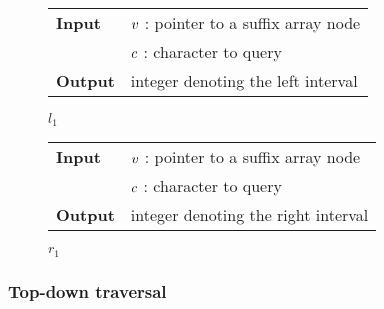 \begin{figure*}[t!]
\begin{minipage}[t]{.5\textwidth}
\begin{algorithm}[H]
\begin{tabular}{ll}
\textbf{Input}  & $v$ : pointer to a suffix array node\\
				& $c$ : character to query\\
\textbf{Output} & integer denoting the left interval\\
\end{tabular}
\begin{algorithmic}[1]
	\Else
	\EndIf
\EndWhile
\State \Return $l_1$
\end{algorithmic}
\label{alg:sa-lower}
\end{algorithm}
\end{minipage}
\hfill
\begin{minipage}[t]{.5\textwidth}
\begin{algorithm}[H]
\begin{tabular}{ll}
\textbf{Input}  & $v$ : pointer to a suffix array node\\
				& $c$ : character to query\\
\textbf{Output} & integer denoting the right interval\\
\end{tabular}
\begin{algorithmic}[1]
	\Else
	\EndIf
\EndWhile
\State \Return $r_1$
\end{algorithmic}
\label{alg:sa-upper}
\end{algorithm}
\end{minipage}
\end{figure*}

\subsubsection{Top-down traversal}

